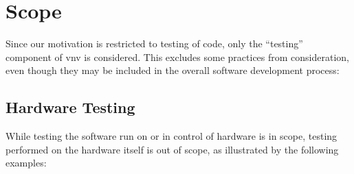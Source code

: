\section{Scope}
\label{scope}

Since our motivation is restricted to testing of code, only the ``testing''
component of \acf{vnv} is considered. This excludes some
practices from consideration, even though they may be included in the
overall software development process:

\subsection{Hardware Testing}
While testing the software run on or in control of hardware is in scope,
testing performed on the hardware itself is out of scope, as illustrated by the
following examples:

